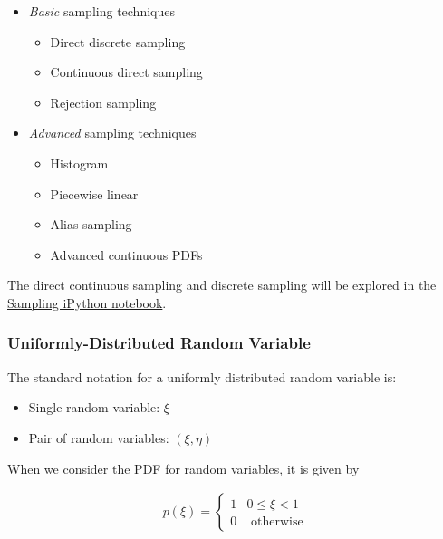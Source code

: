 \documentclass[12pt]{article}
\begin{document}
\begin{itemize}
  \item \textit{Basic} sampling techniques
  \begin{itemize}
    \item Direct discrete sampling
    \item Continuous direct sampling
    \item Rejection sampling
  \end{itemize}
  
  \item \textit{Advanced }sampling techniques
  \begin{itemize}
    \item Histogram
    \item Piecewise linear
    \item Alias sampling
    \item Advanced continuous PDFs
  \end{itemize}
\end{itemize}

The direct continuous sampling and discrete sampling will be explored in the \href{08-03_Sampling.ipynb}{Sampling iPython notebook}.

\subsubsection*{Uniformly-Distributed Random Variable}

The standard notation for a uniformly distributed random variable is:

\begin{itemize}
  \item Single random variable: $\xi$
  \item Pair of random variables: $(\xi, \eta)$
\end{itemize}
      
When we consider the PDF for random variables, it is given by 

\begin{align*}
  p(\xi) = \begin{cases} 
  1 & 0 \leq \xi < 1 \\ 
  0 & \text{ otherwise} 
  \end{cases}
\end{align*}
  
\end{document}
